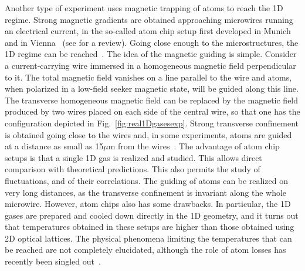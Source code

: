 \documentclass[onecolumn,amsfonts,showpacs,superscriptaddress]{revtex4-1}
\begin{document}
Another type of experiment uses magnetic trapping of atoms to reach the 1D regime.
Strong magnetic gradients are obtained approaching microwires
running an electrical current, in the so-called atom chip
setup first 
developed in Munich~\citep{reichel_atomic_1999} and 
in Vienna~\cite{folman_controlling_2000} (see
\citep{reichel2011atom} for a review). Going 
close enough to the microstructures, the 1D regime
can be reached~\citep{van_amerongen_yang-yang_2008,armijo_mapping_2011,jacqmin_sub-poissonian_2011}. The idea of the magnetic guiding is simple. 
Consider a current-carrying wire immersed in a homogeneous magnetic field perpendicular to it. The 
total magnetic field vanishes on a line parallel to the wire and atoms, when polarized in a low-field seeker magnetic state, will be guided along this line. 
The transverse homogeneous magnetic field can be replaced by the magnetic field produced by two wires placed on each side of the central wire, so that one has the configuration depicted in Fig.~\ref{fig:real1Dgasesexp}. Strong transverse confinement is obtained going close to the wires and, in some experiments, atoms are guided at a distance as small as 15$\mu$m from the wires~\citep{jacqmin_sub-poissonian_2011}. 
The advantage of atom chip setups is that a single 1D gas is realized and studied. This allows direct comparison with theoretical predictions. This also permits the study of fluctuations, and of their correlations. The guiding of atoms can be realized on very long distances, as the transverse confinement is invariant along the whole microwire. However,  atom chips also has some drawbacks. In particular, the 1D gases are prepared and cooled down directly in the 1D geometry, and it turns out that temperatures obtained in these setups are higher than those obtained using 2D optical lattices. The physical phenomena limiting the temperatures that can be reached are not completely elucidated, although the role of atom losses has recently been singled out~\citep{rauer_cooling_2016,schemmer_cooling_2018,bouchoule_asymptotic_2020}.
\end{document}
